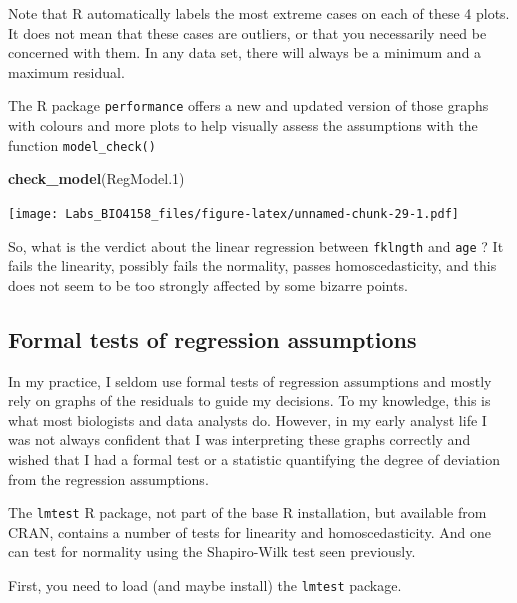 \documentclass[
  12pt,
]{book}
\makeatletter
\newenvironment{Shaded}{\begin{snugshade}}{\end{snugshade}}
\newcommand{\FloatTok}[1]{\textcolor[rgb]{0.00,0.00,0.81}{#1}}
\newcommand{\KeywordTok}[1]{\textcolor[rgb]{0.13,0.29,0.53}{\textbf{#1}}}
\newcommand{\NormalTok}[1]{#1}
\newenvironment{kframe}{%
\medskip{}
\setlength{\fboxsep}{.8em}
\def\at@end@of@kframe{}%
\ifinner\ifhmode%
 \def\at@end@of@kframe{\end{minipage}}%
 \begin{minipage}{\columnwidth}%
\fi\fi%
\def\FrameCommand##1{\hskip\@totalleftmargin \hskip-\fboxsep
\colorbox{incolor}{##1}\hskip-\fboxsep
    \hskip-\linewidth \hskip-\@totalleftmargin \hskip\columnwidth}%
\MakeFramed {\advance\hsize-\width
  \@totalleftmargin\z@ \linewidth\hsize
  \@setminipage}}%
{\par\unskip\endMakeFramed%
\at@end@of@kframe}
\newenvironment{rmdblock}[1]
 {
 \begin{itemize}
 \renewcommand{\labelitemi}{
   \raisebox{-.7\height}[0pt][0pt]{
     {\setkeys{Gin}{width=3em,keepaspectratio}\texttt{[image: images/\#1]}}
   }
 }
 \begin{kframe}
 \setlength{\fboxsep}{1em}
 \item
 }
 {
 \end{kframe}
 \end{itemize}
 }
\newenvironment{rmdwarning}
  {\begin{rmdblock}{warning}}
  {\end{rmdblock}}
\makeatother
\begin{document}
\begin{rmdwarning}
Note that R automatically labels the most extreme cases on each of these 4 plots. It does not mean that these cases are outliers, or that you necessarily need be concerned with them. In any data set, there will always be a minimum and a maximum residual.
\end{rmdwarning}

The R package \texttt{performance} offers a new and updated version of those graphs with colours and more plots to help visually assess the assumptions with the function \texttt{model\_check()}

\begin{Shaded}
\begin{Highlighting}[]
\KeywordTok{check\_model}\NormalTok{(RegModel}\FloatTok{.1}\NormalTok{)}
\end{Highlighting}
\end{Shaded}

\texttt{[image: Labs\_BIO4158\_files/figure-latex/unnamed-chunk-29-1.pdf]}

So, what is the verdict about the linear regression between \texttt{fklngth} and \texttt{age} ? It fails the linearity, possibly fails the normality, passes homoscedasticity, and this does not seem to be too strongly affected by some bizarre points.

\hypertarget{formal-tests-of-regression-assumptions}{%
\subsection{Formal tests of regression assumptions}\label{formal-tests-of-regression-assumptions}}

In my practice, I seldom use formal tests of regression assumptions and mostly rely on graphs of the residuals to guide my decisions. To my knowledge, this is what most biologists and data analysts do. However, in my early analyst life I was not always confident that I was interpreting these graphs correctly and wished that I had a formal test or a statistic quantifying the degree of deviation from the regression assumptions.

The \texttt{lmtest} R package, not part of the base R installation, but available from CRAN, contains a number of tests for linearity and homoscedasticity. And one can test for normality using the Shapiro-Wilk test seen previously.

First, you need to load (and maybe install) the \texttt{lmtest} package.
\end{document}

